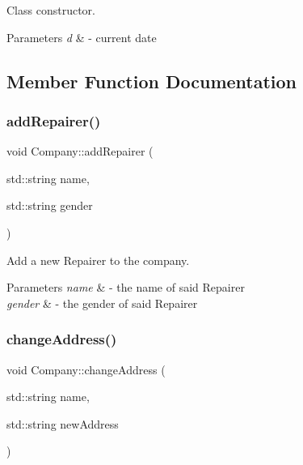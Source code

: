 Class constructor. 


\begin{DoxyParams}{Parameters}
{\em d} & -\/ current date \\
\hline
\end{DoxyParams}


\subsection{Member Function Documentation}
\mbox{\label{class_company_a0f5c39b78a484f841f71bbcc33946774}} 
\subsubsection{\texorpdfstring{add\+Repairer()}{addRepairer()}}
{\footnotesize\ttfamily void Company\+::add\+Repairer (\begin{DoxyParamCaption}\item[{std\+::string}]{name,  }\item[{std\+::string}]{gender }\end{DoxyParamCaption})}



Add a new Repairer to the company. 


\begin{DoxyParams}{Parameters}
{\em name} & -\/ the name of said Repairer \\
\hline
{\em gender} & -\/ the gender of said Repairer \\
\hline
\end{DoxyParams}
\mbox{\label{class_company_aa5eac670a965d063cd700acc09effec7}} 
\subsubsection{\texorpdfstring{change\+Address()}{changeAddress()}}
{\footnotesize\ttfamily void Company\+::change\+Address (\begin{DoxyParamCaption}\item[{std\+::string}]{name,  }\item[{std\+::string}]{new\+Address }\end{DoxyParamCaption})}



